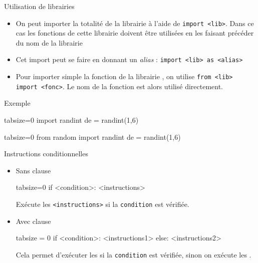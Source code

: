 \documentclass[10pt]{beamer}
\begin{document}
\begin{frame}[fragile]{\Ctitle}{\stitle}
	\begin{alertblock}{Utilisation de librairies}
		\begin{itemize}
			\item<1-> On peut importer la totalité de la librairie  à l'aide de \texttt{import <lib>}. Dans ce cas les fonctions de cette librairie doivent être utilisées en les faisant précéder du nom de la librairie
			\item<2-> Cet import peut se faire en donnant un \textit{alias} : \texttt{import <lib> as <alias>}
			\item<3-> Pour importer simple la fonction  de la librairie , on utilise \texttt{from <lib> import <fonc>}. Le nom de la fonction est alors utilisé directement.
		\end{itemize}
	\end{alertblock}
	\begin{exampleblock}{Exemple}
		\onslide<4->\begin{codepython*}{tabsize=0}
			import randint
			de = randint(1,6)
		\end{codepython*}
		\begin{codepython*}{tabsize=0}
			from random import randint
			de = randint(1,6)
		\end{codepython*}
	\end{exampleblock}
\end{frame}


\begin{frame}[fragile]{\Ctitle}{\stitle}
	\begin{alertblock}{Instructions conditionnelles}
		\begin{itemize}
			\item<1-> Sans clause 
				\begin{codepython*}{tabsize=0}
					if <condition>:
					<instructions>
				\end{codepython*}
				Exécute les {\tt <instructions>} si la {\tt condition} est vérifiée.
			\item<2-> Avec clause 
				\begin{codepython*}{tabsize = 0}
					if <condition>:
					<instructions1>
					else:
					<instructions2>
				\end{codepython*}
				Cela permet d'exécuter les {\tt <instructions1>} si la {\tt condition} est vérifiée, sinon on exécute les {\tt <instructions2>}.
		\end{itemize}
	\end{alertblock}
\end{frame}
\end{document}
